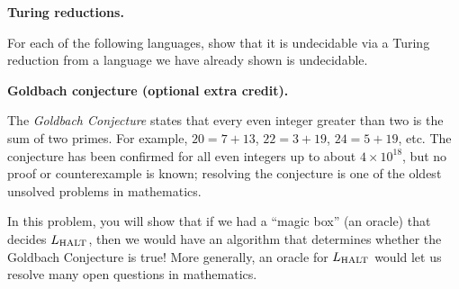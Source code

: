\documentclass[11pt,addpoints,answers]{exam}
\begin{document}
\begin{questions}
\begin{parts}
\end{parts}


  \question \textbf{Turing reductions.} \label{tr}

  For each of the following languages, show that it is undecidable via a Turing reduction from a language we have already shown is undecidable.


  \bonusquestion \textbf{Goldbach conjecture (optional extra credit).} 
  
  The \emph{Goldbach Conjecture} states that every even integer greater than two is the sum of two primes.
  For example, $20=7+13$, $22=3+19$, $24=5+19$, etc. The conjecture has been confirmed for all even integers up to about $4 \times 10^{18}$, but no proof or counterexample is known; resolving the conjecture is one of the oldest unsolved problems in mathematics.

  In this problem, you will show that if we had a ``magic box'' (an oracle) that decides $L_{\text{HALT}}$, then we would have an algorithm that determines whether the Goldbach Conjecture is true!
  More generally, an oracle for $L_{\text{HALT}}$ would let us resolve many open questions in mathematics.


\end{questions}
\end{document}
